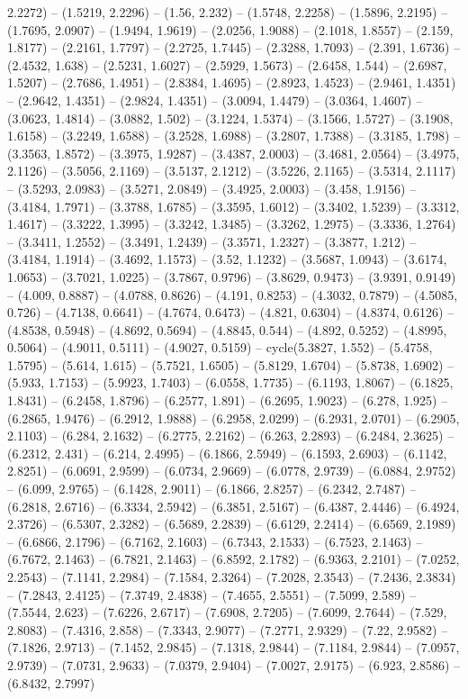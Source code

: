 2.2272) -- (1.5219, 2.2296) -- (1.56, 2.232) -- (1.5748, 2.2258) -- (1.5896, 2.2195) -- (1.7695, 2.0907) -- (1.9494, 1.9619) -- (2.0256, 1.9088) -- (2.1018, 1.8557) -- (2.159, 1.8177) -- (2.2161, 1.7797) -- (2.2725, 1.7445) -- (2.3288, 1.7093) -- (2.391, 1.6736) -- (2.4532, 1.638) -- (2.5231, 1.6027) -- (2.5929, 1.5673) -- (2.6458, 1.544) -- (2.6987, 1.5207) -- (2.7686, 1.4951) -- (2.8384, 1.4695) -- (2.8923, 1.4523) -- (2.9461, 1.4351) -- (2.9642, 1.4351) -- (2.9824, 1.4351) -- (3.0094, 1.4479) -- (3.0364, 1.4607) -- (3.0623, 1.4814) -- (3.0882, 1.502) -- (3.1224, 1.5374) -- (3.1566, 1.5727) -- (3.1908, 1.6158) -- (3.2249, 1.6588) -- (3.2528, 1.6988) -- (3.2807, 1.7388) -- (3.3185, 1.798) -- (3.3563, 1.8572) -- (3.3975, 1.9287) -- (3.4387, 2.0003) -- (3.4681, 2.0564) -- (3.4975, 2.1126) -- (3.5056, 2.1169) -- (3.5137, 2.1212) -- (3.5226, 2.1165) -- (3.5314, 2.1117) -- (3.5293, 2.0983) -- (3.5271, 2.0849) -- (3.4925, 2.0003) -- (3.458, 1.9156) -- (3.4184, 1.7971) -- (3.3788, 1.6785) -- (3.3595, 1.6012) -- (3.3402, 1.5239) -- (3.3312, 1.4617) -- (3.3222, 1.3995) -- (3.3242, 1.3485) -- (3.3262, 1.2975) -- (3.3336, 1.2764) -- (3.3411, 1.2552) -- (3.3491, 1.2439) -- (3.3571, 1.2327) -- (3.3877, 1.212) -- (3.4184, 1.1914) -- (3.4692, 1.1573) -- (3.52, 1.1232) -- (3.5687, 1.0943) -- (3.6174, 1.0653) -- (3.7021, 1.0225) -- (3.7867, 0.9796) -- (3.8629, 0.9473) -- (3.9391, 0.9149) -- (4.009, 0.8887) -- (4.0788, 0.8626) -- (4.191, 0.8253) -- (4.3032, 0.7879) -- (4.5085, 0.726) -- (4.7138, 0.6641) -- (4.7674, 0.6473) -- (4.821, 0.6304) -- (4.8374, 0.6126) -- (4.8538, 0.5948) -- (4.8692, 0.5694) -- (4.8845, 0.544) -- (4.892, 0.5252) -- (4.8995, 0.5064) -- (4.9011, 0.5111) -- (4.9027, 0.5159) -- cycle(5.3827, 1.552) -- (5.4758, 1.5795) -- (5.614, 1.615) -- (5.7521, 1.6505) -- (5.8129, 1.6704) -- (5.8738, 1.6902) -- (5.933, 1.7153) -- (5.9923, 1.7403) -- (6.0558, 1.7735) -- (6.1193, 1.8067) -- (6.1825, 1.8431) -- (6.2458, 1.8796) -- (6.2577, 1.891) -- (6.2695, 1.9023) -- (6.278, 1.925) -- (6.2865, 1.9476) -- (6.2912, 1.9888) -- (6.2958, 2.0299) -- (6.2931, 2.0701) -- (6.2905, 2.1103) -- (6.284, 2.1632) -- (6.2775, 2.2162) -- (6.263, 2.2893) -- (6.2484, 2.3625) -- (6.2312, 2.431) -- (6.214, 2.4995) -- (6.1866, 2.5949) -- (6.1593, 2.6903) -- (6.1142, 2.8251) -- (6.0691, 2.9599) -- (6.0734, 2.9669) -- (6.0778, 2.9739) -- (6.0884, 2.9752) -- (6.099, 2.9765) -- (6.1428, 2.9011) -- (6.1866, 2.8257) -- (6.2342, 2.7487) -- (6.2818, 2.6716) -- (6.3334, 2.5942) -- (6.3851, 2.5167) -- (6.4387, 2.4446) -- (6.4924, 2.3726) -- (6.5307, 2.3282) -- (6.5689, 2.2839) -- (6.6129, 2.2414) -- (6.6569, 2.1989) -- (6.6866, 2.1796) -- (6.7162, 2.1603) -- (6.7343, 2.1533) -- (6.7523, 2.1463) -- (6.7672, 2.1463) -- (6.7821, 2.1463) -- (6.8592, 2.1782) -- (6.9363, 2.2101) -- (7.0252, 2.2543) -- (7.1141, 2.2984) -- (7.1584, 2.3264) -- (7.2028, 2.3543) -- (7.2436, 2.3834) -- (7.2843, 2.4125) -- (7.3749, 2.4838) -- (7.4655, 2.5551) -- (7.5099, 2.589) -- (7.5544, 2.623) -- (7.6226, 2.6717) -- (7.6908, 2.7205) -- (7.6099, 2.7644) -- (7.529, 2.8083) -- (7.4316, 2.858) -- (7.3343, 2.9077) -- (7.2771, 2.9329) -- (7.22, 2.9582) -- (7.1826, 2.9713) -- (7.1452, 2.9845) -- (7.1318, 2.9844) -- (7.1184, 2.9844) -- (7.0957, 2.9739) -- (7.0731, 2.9633) -- (7.0379, 2.9404) -- (7.0027, 2.9175) -- (6.923, 2.8586) -- (6.8432, 2.7997) 